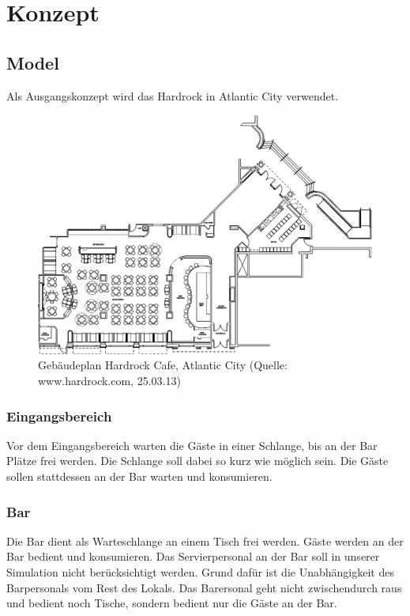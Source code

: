 \documentclass[ngerman,a4paper,12pt]{scrreprt}
\begin{document}
\chapter{Konzept}


\section{Model}
Als Ausgangskonzept wird das Hardrock in Atlantic City verwendet.
\begin{figure}[htp]
	\centering
		\includegraphics[width=1\textwidth]{img/hardrock-plan.png}
		\caption[Gebäudeplan Hardrock]{Gebäudeplan Hardrock Cafe, Atlantic City (Quelle: www.hardrock.com, 25.03.13)}
		\label{planHardrock}
\end{figure}

\subsection{Eingangsbereich}
Vor dem Eingangsbereich warten die Gäste in einer Schlange, bis an der Bar Plätze frei werden. Die Schlange soll dabei so kurz wie möglich sein. Die Gäste sollen stattdessen an der Bar warten und konsumieren.

\subsection{Bar}
Die Bar dient als Warteschlange an einem Tisch frei werden. Gäste werden an der Bar bedient und konsumieren.
Das Servierpersonal an der Bar soll in unserer Simulation nicht berücksichtigt werden. Grund dafür ist die Unabhängigkeit des Barpersonals vom Rest des Lokals. Das Barersonal geht nicht zwischendurch raus und bedient noch Tische, sondern bedient nur die Gäste an der Bar.
\end{document}
